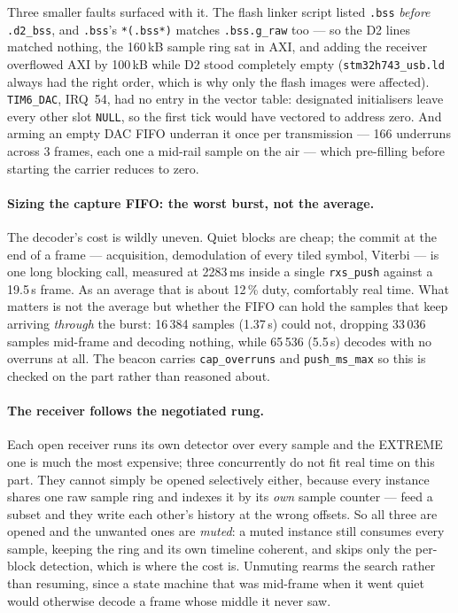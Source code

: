 Three smaller faults surfaced with it. The flash linker script listed
\texttt{.bss} \emph{before} \texttt{.d2\_bss}, and \texttt{.bss}'s
\texttt{*(.bss*)} matches \texttt{.bss.g\_raw} too --- so the D2 lines
matched nothing, the 160\,kB sample ring sat in AXI, and adding the
receiver overflowed AXI by 100\,kB while D2 stood completely empty
(\texttt{stm32h743\_usb.ld} always had the right order, which is why only
the flash images were affected). \texttt{TIM6\_DAC}, IRQ~54, had no entry
in the vector table: designated initialisers leave every other slot
\texttt{NULL}, so the first tick would have vectored to address zero.
And arming an empty DAC FIFO underran it once per transmission ---
166 underruns across 3 frames, each one a mid-rail sample on the air ---
which pre-filling before starting the carrier reduces to zero.

\paragraph{Sizing the capture FIFO: the worst burst, not the average.}
The decoder's cost is wildly uneven. Quiet blocks are cheap; the commit
at the end of a frame --- acquisition, demodulation of every tiled
symbol, Viterbi --- is one long blocking call, measured at 2283\,ms
inside a single \texttt{rxs\_push} against a 19.5\,s frame. As an
average that is about 12\,\% duty, comfortably real time. What matters
is not the average but whether the FIFO can hold the samples that keep
arriving \emph{through} the burst: 16\,384 samples (1.37\,s) could not,
dropping 33\,036 samples mid-frame and decoding nothing, while 65\,536
(5.5\,s) decodes with no overruns at all. The beacon carries
\texttt{cap\_overruns} and \texttt{push\_ms\_max} so this is checked on
the part rather than reasoned about.

\paragraph{The receiver follows the negotiated rung.} Each open receiver
runs its own detector over every sample and the EXTREME one is much the
most expensive; three concurrently do not fit real time on this part.
They cannot simply be opened selectively either, because every instance
shares one raw sample ring and indexes it by its \emph{own} sample
counter --- feed a subset and they write each other's history at the
wrong offsets. So all three are opened and the unwanted ones are
\emph{muted}: a muted instance still consumes every sample, keeping the
ring and its own timeline coherent, and skips only the per-block
detection, which is where the cost is. Unmuting rearms the search rather
than resuming, since a state machine that was mid-frame when it went
quiet would otherwise decode a frame whose middle it never saw.

